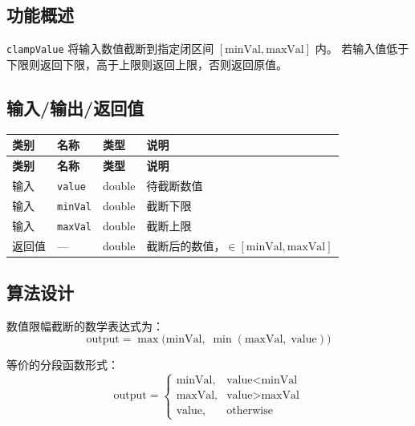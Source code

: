 \documentclass[a4paper,10pt]{article}
\begin{document}
\subsection{功能概述}

\texttt{clampValue} 将输入数值截断到指定闭区间 $[\text{minVal}, \text{maxVal}]$ 内。
若输入值低于下限则返回下限，高于上限则返回上限，否则返回原值。

\subsection{输入/输出/返回值}

\renewcommand{\arraystretch}{1.3}
\begin{longtable}{|C{1.5cm}|L{3.5cm}|C{2cm}|L{8cm}|}
\hline
\textbf{类别} & \textbf{名称} & \textbf{类型} & \textbf{说明} \\
\hline
\endfirsthead
\hline
\textbf{类别} & \textbf{名称} & \textbf{类型} & \textbf{说明} \\
\hline
\endhead
输入 & \texttt{value} & double & 待截断数值 \\
\hline
输入 & \texttt{minVal} & double & 截断下限 \\
\hline
输入 & \texttt{maxVal} & double & 截断上限 \\
\hline
返回值 & --- & double & 截断后的数值，$\in [\text{minVal}, \text{maxVal}]$ \\
\hline
\end{longtable}

\subsection{算法设计}

数值限幅截断的数学表达式为：
\begin{equation}
  \text{output} = \max\!\big(\text{minVal},\; \min(\text{maxVal},\; \text{value})\big)
\end{equation}

等价的分段函数形式：
\begin{equation}
  \text{output} =
  \begin{cases}
    \text{minVal}, & \text{value} < \text{minVal} \\
    \text{maxVal}, & \text{value} > \text{maxVal} \\
    \text{value},  & \text{otherwise}
  \end{cases}
\end{equation}
\end{document}
